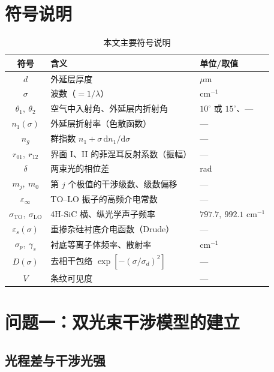 \documentclass[11pt,a4paper,fontset=fandol]{ctexart}
\begin{document}
\section{符号说明}
\begin{table}[htbp]
    \centering
    \caption{本文主要符号说明}
    \label{tab:symbols}
    \small
    \begin{tabular}{cll}
        \toprule
        符号 & 含义 & 单位/取值 \\
        \midrule
        $d$ & 外延层厚度 & $\mu$m \\
        $\sigma$ & 波数（$=1/\lambda$） & cm$^{-1}$ \\
        $\theta_1,\ \theta_2$ & 空气中入射角、外延层内折射角 & $10^\circ$ 或 $15^\circ$、— \\
        $n_1(\sigma)$ & 外延层折射率（色散函数） & — \\
        $n_g$ & 群指数 $n_1+\sigma\,\mathrm{d}n_1/\mathrm{d}\sigma$ & — \\
        $r_{01},\ r_{12}$ & 界面 I、II 的菲涅耳反射系数（振幅） & — \\
        $\delta$ & 两束光的相位差 & rad \\
        $m_j,\ m_0$ & 第 $j$ 个极值的干涉级数、级数偏移 & — \\
        $\varepsilon_\infty$ & TO--LO 振子的高频介电常数 & — \\
        $\sigma_{\mathrm{TO}},\ \sigma_{\mathrm{LO}}$ & 4H-SiC 横、纵光学声子频率 & $797.7,\ 992.1$ cm$^{-1}$ \\
        $\varepsilon_s(\sigma)$ & 重掺杂硅衬底介电函数（Drude） & — \\
        $\sigma_p,\ \gamma_s$ & 衬底等离子体频率、散射率 & cm$^{-1}$ \\
        $D(\sigma)$ & 去相干包络 $\exp[-(\sigma/\sigma_d)^2]$ & — \\
        $V$ & 条纹可见度 & — \\
        \bottomrule
    \end{tabular}
\end{table}

\section{问题一：双光束干涉模型的建立}

\subsection{光程差与干涉光强}
\end{document}
